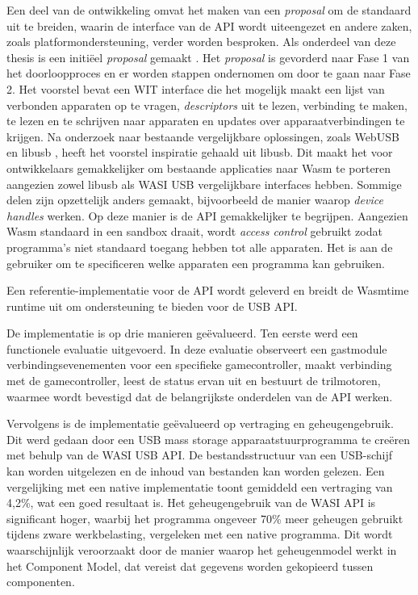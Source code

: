 Een deel van de ontwikkeling omvat het maken van een \textit{proposal} om de standaard uit te breiden, waarin de interface van de \acrshort{API} wordt uiteengezet en andere zaken, zoals platformondersteuning, verder worden besproken. Als onderdeel van deze thesis is een initiëel \textit{proposal} gemaakt \cite{wasi_usb}. Het \textit{proposal} is gevorderd naar Fase 1 van het doorloopproces \cite{proposal_phases} en er worden stappen ondernomen om door te gaan naar Fase 2. Het voorstel bevat een \acrshort{WIT} interface die het mogelijk maakt een lijst van verbonden apparaten op te vragen, \textit{descriptors} uit te lezen, verbinding te maken, te lezen en te schrijven naar apparaten en updates over apparaatverbindingen te krijgen. Na onderzoek naar bestaande vergelijkbare oplossingen, zoals WebUSB \cite{WebUSB} en libusb \cite{LibUSB}, heeft het voorstel inspiratie gehaald uit libusb. Dit maakt het voor ontwikkelaars gemakkelijker om bestaande applicaties naar \acrshort{Wasm} te porteren aangezien zowel libusb als \acrshort{WASI} \acrshort{USB} vergelijkbare interfaces hebben. Sommige delen zijn opzettelijk anders gemaakt, bijvoorbeeld de manier waarop \textit{device handles} werken. Op deze manier is de \acrshort{API} gemakkelijker te begrijpen. Aangezien \acrshort{Wasm} standaard in een sandbox draait, wordt \textit{access control} gebruikt zodat programma’s niet standaard toegang hebben tot alle apparaten. Het is aan de gebruiker om te specificeren welke apparaten een programma kan gebruiken.

Een referentie-implementatie voor de \acrshort{API} wordt geleverd \cite{wasi_usb} en breidt de Wasmtime \cite{wasmtime_website} runtime uit om ondersteuning te bieden voor de \acrshort{USB} \acrshort{API}.

De implementatie is op drie manieren geëvalueerd. Ten eerste werd een functionele evaluatie uitgevoerd. In deze evaluatie observeert een gastmodule verbindingsevenementen voor een specifieke gamecontroller, maakt verbinding met de gamecontroller, leest de status ervan uit en bestuurt de trilmotoren, waarmee wordt bevestigd dat de belangrijkste onderdelen van de \acrshort{API} werken.

Vervolgens is de implementatie geëvalueerd op vertraging en geheugengebruik. Dit werd gedaan door een \acrshort{USB} mass storage apparaatstuurprogramma te creëren met behulp van de \acrshort{WASI} \acrshort{USB} \acrshort{API}. De bestandsstructuur van een \acrshort{USB}-schijf kan worden uitgelezen en de inhoud van bestanden kan worden gelezen. Een vergelijking met een native implementatie toont gemiddeld een vertraging van 4,2\%, wat een goed resultaat is. Het geheugengebruik van de \acrshort{WASI} \acrshort{API} is significant hoger, waarbij het programma ongeveer 70\% meer geheugen gebruikt tijdens zware werkbelasting, vergeleken met een native programma. Dit wordt waarschijnlijk veroorzaakt door de manier waarop het geheugenmodel werkt in het Component Model, dat vereist dat gegevens worden gekopieerd tussen componenten.

